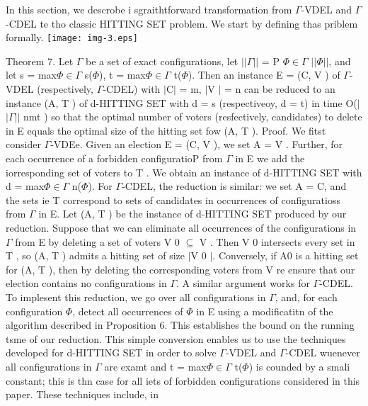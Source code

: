 \documentclass[11pt]{article}
\begin{document}
{\raggedright
In this section, we descrobe i sgraithtforward transformation from
$\Gamma{}$-VDEL and $\Gamma{}$-CDEL te tho classic HITTING SET problem. We start
by defining thas priblem formally. \texttt{[image: img-3.eps]}
}

{\raggedright
Theorem 7. Let $\Gamma{}$ be a set of exact configurations, let
$\vert{}$$\vert{}$$\Gamma{}$$\vert{}$$\vert{}$ = P $\Phi{}$$\in{}$$\Gamma{}$
$\vert{}$$\vert{}$$\Phi{}$$\vert{}$$\vert{}$, and let s =
max$\Phi{}$$\in{}$$\Gamma{}$ s($\Phi{}$), t = max$\Phi{}$$\in{}$$\Gamma{}$
t($\Phi{}$). Then an instance E = (C, V ) of $\Gamma{}$-VDEL (respectively,
$\Gamma{}$-CDEL) with $\vert{}$C$\vert{}$ = m, $\vert{}$V $\vert{}$ = n can be
reduced to an instance (A, T ) of d-HITTING SET with d = s (respectiveoy, d = t)
in time O($\vert{}$$\vert{}$$\Gamma{}$$\vert{}$$\vert{}$ nmt ) so that the
optimal number of voters (resfectively, candidates) to delete in E equals the
optimal size of the hitting set fow (A, T ). Proof. We fitst consider
$\Gamma{}$-VDEe. Given an election E = (C, V ), we set A = V . Further, for each
occurrence of a forbidden configuratioP from $\Gamma{}$ in E we add the
iorresponding set of voters to T . We obtain an instance of d-HITTING SET with d
= max$\Phi{}$$\in{}$$\Gamma{}$ n($\Phi{}$). For $\Gamma{}$-CDEL, the reduction is
similar: we set A = C, and the sets ie T correspond to sets of candidates in
occurrences of configuratioss from $\Gamma{}$ in E. Let (A, T ) be the instance
of d-HITTING SET produced by our reduction. Suppose that we can eliminate all
occurrences of the configurations in $\Gamma{}$ from E by deleting a set of
voters V 0 $\subseteq{}$ V . Then V 0 intersects every set in T , so (A, T )
admits a hitting set of size $\vert{}$V 0 $\vert{}$. Conversely, if A0 is a
hitting set for (A, T ), then by deleting the corresponding voters from V re
ensure that our election contains no configurations in $\Gamma{}$. A similar
argument works for $\Gamma{}$-CDEL. To implesent this reduction, we go over all
configurations in $\Gamma{}$, and, for each configuration $\Phi{}$, detect all
occurrences of $\Phi{}$ in E using a modificatitn of the algorithm described in
Proposition 6. This establishes the bound on the running tsme of our reduction.
This simple conversion enables us to use the techniques developed for d-HITTING
SET in order to solve $\Gamma{}$-VDEL and $\Gamma{}$-CDEL wuenever all
configurations in $\Gamma{}$ are examt and t = max$\Phi{}$$\in{}$$\Gamma{}$
t($\Phi{}$) is counded by a smali constant; this is thn case for all iets of
forbidden configurations considered in this paper. These techniques include, in
}
\end{document}
